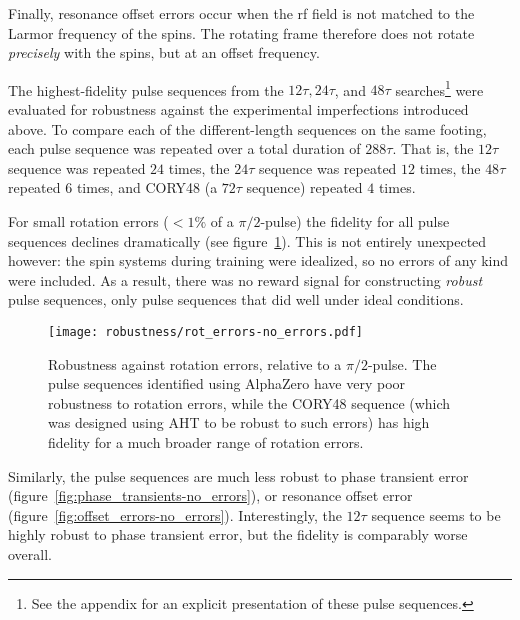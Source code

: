 Finally, resonance offset errors occur when the rf field is not matched to the Larmor frequency of the spins. The rotating frame therefore does not rotate \emph{precisely} with the spins, but at an offset frequency.

The highest-fidelity pulse sequences from the $12\tau, 24\tau$, and $48\tau$ searches\footnote{
See the appendix for an explicit presentation of these pulse sequences.
} were evaluated for robustness against the experimental imperfections introduced above. To compare each of the different-length sequences on the same footing, each pulse sequence was repeated over a total duration of $288\tau$. That is, the $12\tau$ sequence was repeated $24$ times, the $24\tau$ sequence was repeated $12$ times, the $48\tau$ repeated $6$ times, and CORY48 (a $72\tau$ sequence) repeated $4$ times.



For small rotation errors ($<1\%$ of a $\pi/2$-pulse) the fidelity for all pulse sequences declines dramatically (see figure~\ref{fig:rot_errors-no_errors}).
This is not entirely unexpected however: the spin systems during training were idealized, so no errors of any kind were included. As a result, there was no reward signal for constructing \emph{robust} pulse sequences, only pulse sequences that did well under ideal conditions.





\begin{figure}[H]
    \centering
    \texttt{[image: robustness/rot\_errors-no\_errors.pdf]}
    \caption{Robustness against rotation errors, relative to a $\pi/2$-pulse. The pulse sequences identified using AlphaZero have very poor robustness to rotation errors, while the CORY48 sequence (which was designed using AHT to be robust to such errors) has high fidelity for a much broader range of rotation errors.
    }
    \label{fig:rot_errors-no_errors}
\end{figure}

Similarly, the pulse sequences are much less robust to phase transient error (figure~\ref{fig:phase_transients-no_errors}), or
resonance offset error (figure~\ref{fig:offset_errors-no_errors}). Interestingly, the $12\tau$ sequence seems to be highly robust to phase transient error, but the fidelity is comparably worse overall.


